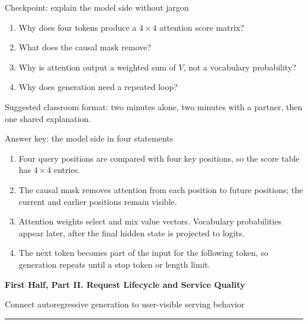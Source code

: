 \documentclass[aspectratio=169,11pt]{beamer}
\newcommand{\smallnote}[1]{\textcolor{HUSTGray}{\footnotesize #1}}
\newcommand{\topicsectionpage}[2]{%
  \begin{frame}[plain]
    \vspace{1.0cm}
    {\huge\bfseries\textcolor{HUSTBlue}{#1}}\par
    \vspace{0.26cm}
    {\large\textcolor{HUSTGray}{#2}}\par
    \vfill
    \textcolor{HUSTLine}{\rule{0.76\paperwidth}{0.8pt}}
  \end{frame}
}
\begin{document}
\begin{frame}{Checkpoint: explain the model side without jargon}
  \begin{enumerate}
    \item Why does four tokens produce a \(4\times4\) attention score matrix?
    \item What does the causal mask remove?
    \item Why is attention output a weighted sum of \(V\), not a vocabulary probability?
    \item Why does generation need a repeated loop?
  \end{enumerate}
  \vspace{0.25cm}
  \smallnote{Suggested classroom format: two minutes alone, two minutes with a partner, then one shared explanation.}
\end{frame}

\begin{frame}{Answer key: the model side in four statements}
  \begin{enumerate}
    \item Four query positions are compared with four key positions, so the score table has \(4\times4\) entries.
    \item The causal mask removes attention from each position to future positions; the current and earlier positions remain visible.
    \item Attention weights select and mix value vectors. Vocabulary probabilities appear later, after the final hidden state is projected to logits.
    \item The next token becomes part of the input for the following token, so generation repeats until a stop token or length limit.
  \end{enumerate}
\end{frame}

\topicsectionpage{First Half, Part II. Request Lifecycle and Service Quality}{Connect autoregressive generation to user-visible serving behavior}
\end{document}

